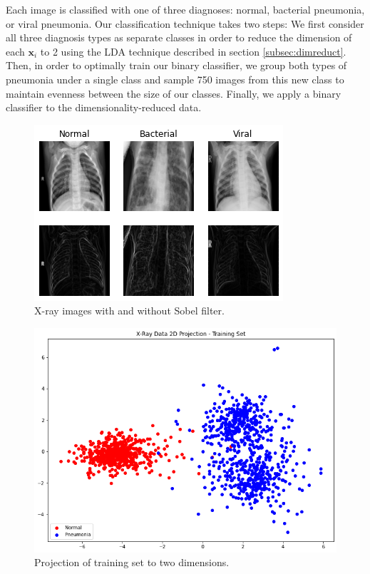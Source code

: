 \documentclass[letterpaper, 10 pt, conference]{ieeeconf}  %
\newcommand{\ve}[1]{\mathbf{#1}}
\begin{document}
Each image is classified with one of three diagnoses: normal, bacterial pneumonia, or viral pneumonia. Our classification technique takes two steps: We first consider all three diagnosis types as separate classes in order to reduce the dimension of each $\ve{x}_i$ to 2 using the LDA technique described in section \ref{subsec:dimreduct}. Then, in order to optimally train our binary classifier, we group both types of pneumonia under a single class and sample 750 images from this new class to maintain evenness between the size of our classes. Finally, we apply a binary classifier to the dimensionality-reduced data. 
\begin{figure}
    \centering
    \includegraphics[width=\columnwidth]{figs/X-rays.png}
    \caption{X-ray images with and without Sobel filter.}
    \label{fig:xrays}
\end{figure}
\begin{figure}
    \centering
    \includegraphics[width=\columnwidth]{figs/X-ray proj.png}
    \caption{Projection of training set to two dimensions.}
    \label{fig:xrayproj}
\end{figure}
\end{document}
